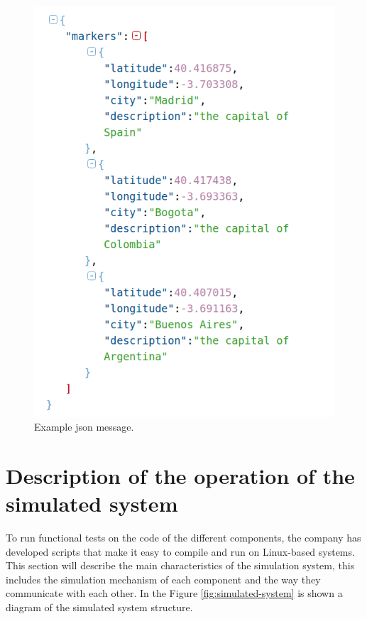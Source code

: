 \documentclass[journal]{IEEEtran}	%
\begin{document}
\begin{figure}[t]
\centering
\includegraphics[width=0.8\columnwidth]{fig11.png}
\caption{Example json message.}
\label{fig:json}
\end{figure}

\section{Description of the operation of the simulated system}

To run functional tests on the code of the different components, the company has developed scripts that make it easy to compile and run on Linux-based systems. This section will describe the main characteristics of the simulation system, this includes the simulation mechanism of each component and the way they communicate with each other. In the Figure \ref{fig:simulated-system} is shown a diagram of the simulated system structure.
\end{document}
